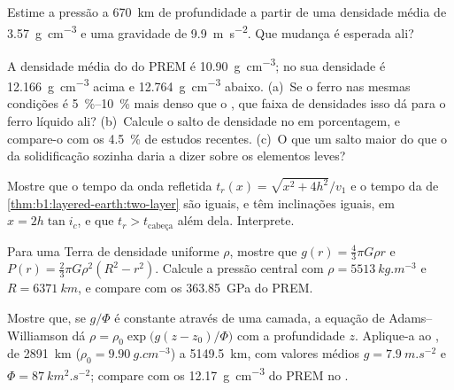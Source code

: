 \begin{exercise}[$\star\star$]\label{exo:b1:layered-earth:8}
Estime a pressão a \qty{670}{km} de profundidade a partir de uma densidade média de \qty{3.57}{g.cm^{-3}} e uma gravidade de \qty{9.9}{m.s^{-2}}. Que mudança  é esperada ali?
\end{exercise}

\begin{exercise}[$\star\star$]\label{exo:b1:layered-earth:9}
A densidade média do  do PREM é \qty{10.90}{g.cm^{-3}}; no  sua densidade é \qty{12.166}{g.cm^{-3}} acima e \qty{12.764}{g.cm^{-3}} abaixo. (a)~Se o ferro nas mesmas condições é \qtyrange{5}{10}{\percent} mais denso que o , que faixa de densidades isso dá para o ferro líquido ali? (b)~Calcule o salto de densidade no  em porcentagem, e compare-o com os \qty{4.5}{\percent} de estudos recentes. (c)~O que um salto maior do que o da solidificação sozinha daria a dizer sobre os elementos leves?
\end{exercise}

\begin{exercise}[$\star\star\star$]\label{exo:b1:layered-earth:10}
Mostre que o tempo da onda refletida $t_r(x) = \sqrt{x^2 + 4h^2}/v_1$ e o tempo da  de \cref{thm:b1:layered-earth:two-layer} são iguais, e têm inclinações iguais, em $x = 2h\tan i_c$, e que $t_r > t_{\text{cabeça}}$ além dela. Interprete.
\end{exercise}

\begin{exercise}[$\star\star\star$]\label{exo:b1:layered-earth:11}
Para uma Terra de densidade uniforme $\rho$, mostre que $g(r) = \tfrac43\pi G\rho r$
e $P(r) = \tfrac23\pi G\rho^2(R^2 - r^2)$. Calcule a pressão central com $\rho = \qty{5513}{kg.m^{-3}}$ e $R = \qty{6371}{km}$, e compare com os \qty{363.85}{GPa} do PREM.
\end{exercise}

\begin{exercise}[$\star\star\star$]\label{exo:b1:layered-earth:12}
Mostre que, se $g/\Phi$ é constante através de uma camada, a equação de Adams--Williamson dá $\rho = \rho_0\exp\bigl(g(z - z_0)/\Phi\bigr)$ com a profundidade $z$. Aplique-a ao , de \qty{2891}{km} ($\rho_0 =
\qty{9.90}{g.cm^{-3}}$) a \qty{5149.5}{km}, com valores médios
$g = \qty{7.9}{m.s^{-2}}$ e $\Phi = \qty{87}{km^2.s^{-2}}$; compare com os \qty{12.17}{g.cm^{-3}} do PREM no .
\end{exercise}

